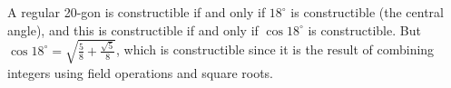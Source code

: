 \documentclass[11pt]{exam}
\begin{document}
\begin{questions}
\begin{solution}
A regular 20-gon is constructible if and only if $18^{\circ}$ is constructible (the central angle), and this is constructible if and only if $\cos 18^{\circ}$ is constructible.  But $\cos 18^{\circ} = \sqrt{\frac{5}{8} + \frac{\sqrt{5}}{8}}$, which is constructible since it is the result of combining integers using field operations and square roots.
\end{solution}

\end{questions}
\end{document}

